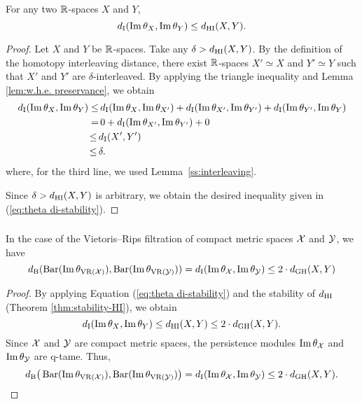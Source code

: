 \subsubsection{}\label{thm:theta stability}
\theorem For any two $\mathbb{R}$-spaces $X$ and $Y$,
\begin{equation}\label{eq:theta di-stability}
	d_{\mathrm{I}}(\operatorname{Im}\theta_{X}, \operatorname{Im}\theta_{Y}) \leq d_{\mathrm{HI}}(X,Y).
\end{equation}

\begin{proof}
	Let $X$ and $Y$ be $\mathbb{R}$-spaces. 
	Take any $\delta > d_{\mathrm{HI}}(X,Y)$.
	By the definition of the homotopy interleaving distance, there exist $\mathbb{R}$-spaces $X' \simeq X$ and $Y' \simeq Y$ such that $X'$ and $Y'$ are $\delta$-interleaved.
	By applying the triangle inequality and Lemma \ref{lem:w.h.e. preservance}, we obtain
	\begin{align*}
		d_{\mathrm{I}}(\operatorname{Im}\theta_{X}, \operatorname{Im}\theta_{Y}) \leq& \,
		d_{\mathrm{I}}(\operatorname{Im}\theta_{X}, \operatorname{Im}\theta_{X'}) + d_{\mathrm{I}}(\operatorname{Im}\theta_{X'}, \operatorname{Im}\theta_{Y'}) + d_{\mathrm{I}}(\operatorname{Im}\theta_{Y'}, \operatorname{Im}\theta_{Y}) \\ =& \, 
		0 + d_{\mathrm{I}}(\operatorname{Im}\theta_{X'}, \operatorname{Im}\theta_{Y'}) + 0 \\ \leq \,&
		d_{\mathrm{I}}(X',Y') \\ \leq \,&
		\delta.
	\end{align*}
	where, for the third line, we used Lemma~\ref{ss:interleaving}.
	
 	Since $\delta > d_{\mathrm{HI}}(X,Y)$ is arbitrary, we obtain the desired inequality given in (\ref{eq:theta di-stability}).
\end{proof}

\subsubsection{}\label{cor:theta stability VR}
\corollary
In the case of the Vietoris--Rips filtration of compact metric spaces $\mathcal{X}$ and $\mathcal{Y}$, we have
\[
d_{\mathrm{B}}(\operatorname{Bar}(\operatorname{Im} \theta_{\operatorname{VR}(\mathcal{X})}), \operatorname{Bar}(\operatorname{Im} \theta_{\operatorname{VR}(\mathcal{Y})})) = d_{\mathrm{I}}(\operatorname{Im}\theta_{\mathcal{X}}, \operatorname{Im}\theta_{\mathcal{Y}}) \leq 2 \cdot d_{\mathrm{GH}}(X,Y)
\]

\begin{proof}
        By applying Equation (\ref{eq:theta di-stability}) and the stability of $d_{\mathrm{HI}}$ (Theorem \ref{thm:stability-HI}), we obtain
        \[
        d_{\mathrm{I}}(\operatorname{Im}\theta_{X}, \operatorname{Im}\theta_{Y}) \leq
        d_{\mathrm{HI}}(X,Y)\leq 2\cdot d_{\mathrm{GH}}(X,Y).
        \]
        Since $\mathcal{X}$ and $\mathcal{Y}$ are compact metric spaces, the persistence modules $\operatorname{Im}\theta_{\mathcal{X}}$ and $\operatorname{Im}\theta_{\mathcal{Y}}$ are q-tame.
        Thus,
        \[
        d_{\mathrm{B}}\big(\operatorname{Bar}(\operatorname{Im} \theta_{\operatorname{VR}(\mathcal{X})}), \operatorname{Bar}(\operatorname{Im} \theta_{\operatorname{VR}(\mathcal{Y})})\big) =
        d_{\mathrm{I}}(\operatorname{Im}\theta_{\mathcal{X}}, \operatorname{Im}\theta_{\mathcal{Y}})\leq 2\cdot d_{\mathrm{GH}}(X,Y).
        \]
\end{proof}


